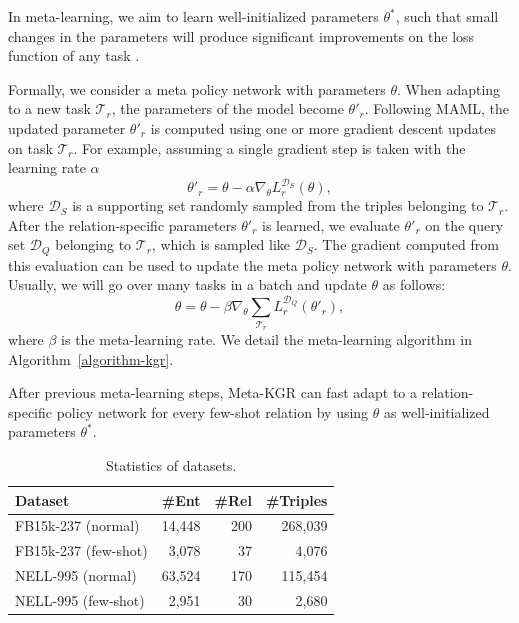 \documentclass[11pt,a4paper]{article}
\begin{document}

In meta-learning, we aim to learn well-initialized parameters $\theta^*$, such that small changes in the parameters will produce significant improvements on the loss function of any task \cite{MAML}.

Formally, we consider a meta policy network with parameters $\theta$. When adapting to a new task $\mathcal{T}_r$, the parameters of the model become $\theta'_r$. Following MAML, the updated parameter $\theta'_r$ is computed using one or more gradient descent updates on task $\mathcal{T}_r$. For example, assuming a single gradient step is taken with the learning rate $\alpha$
\begin{equation}
    \theta'_r = \theta - \alpha \nabla_{\theta}L_r^{\mathcal{D}_S}(\theta),
\end{equation}
where $\mathcal{D}_S$ is a supporting set randomly sampled from the triples belonging to $\mathcal{T}_r$. After the relation-specific parameters $\theta'_r$ is learned, we evaluate $\theta'_r$ on the query set $\mathcal{D}_Q$ belonging to $\mathcal{T}_r$, which is sampled like $\mathcal{D}_S$. The gradient computed from this evaluation can be used to update the meta policy network with parameters $\theta$. Usually, we will go over many tasks in a batch and update $\theta$ as follows:
\begin{equation}
    \theta = \theta - \beta \nabla_{\theta}\sum_{\mathcal{T}_r} L_r^{\mathcal{D}_Q} (\theta'_r),
\end{equation}
where $\beta$ is the meta-learning rate. We detail the meta-learning algorithm in Algorithm~\ref{algorithm-kgr}.

After previous meta-learning steps, Meta-KGR can fast adapt to a relation-specific policy network for every few-shot relation by using $\theta$ as well-initialized parameters $\theta^*$.

\begin{table}[t]
\small
\centering
\setlength{\belowcaptionskip}{-1pt}
    \begin{tabular}{lrrr}
    \toprule
    \textbf{Dataset} & \textbf{\#Ent} & \textbf{\#Rel} & \textbf{\#Triples} \\
    \midrule
    FB15k-237 (normal) & 14,448 & 200 & 268,039 \\
    FB15k-237 (few-shot) & 3,078 & 37 & 4,076 \\
    NELL-995 (normal) & 63,524 & 170 & 115,454 \\
    NELL-995 (few-shot) & 2,951 & 30 & 2,680 \\
    \bottomrule
    \end{tabular} 
    \caption{\label{table2} Statistics of datasets.}
    \vspace{-0.8em}
\end{table}
\end{document}
